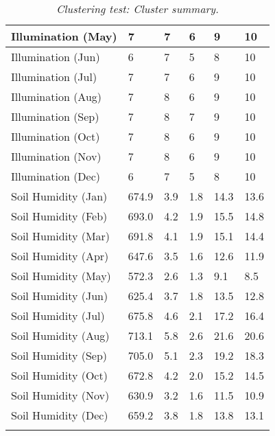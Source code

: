 \begin{longtable}{|p{4cm}|p{2cm}|p{2cm}|p{2cm}|p{2cm}|p{2cm}|}
		\hline
  	    Illumination (May) & 7 & 7 & 6 & 9 & 10 \\
		\hline
		Illumination (Jun) & 6 & 7 & 5 & 8 & 10 \\
		\hline
		Illumination (Jul) & 7 & 7 & 6 & 9 & 10 \\
		\hline
		Illumination (Aug) & 7 & 8 & 6 & 9 & 10 \\
		\hline
		Illumination (Sep) & 7 & 8 & 7 & 9 & 10 \\
		\hline
		Illumination (Oct) & 7 & 8 & 6 & 9 & 10 \\
		\hline
		Illumination (Nov) & 7 & 8 & 6 & 9 & 10 \\
		\hline
		Illumination (Dec) & 6 & 7 & 5 & 8 & 10 \\
		\hline
  	    Soil Humidity (Jan) & 674.9 & 3.9 & 1.8 & 14.3 & 13.6 \\
		\hline
  	    Soil Humidity (Feb) & 693.0 & 4.2 & 1.9 & 15.5 & 14.8 \\
		\hline
  	    Soil Humidity (Mar) & 691.8 & 4.1 & 1.9 & 15.1 & 14.4 \\
		\hline
  	    Soil Humidity (Apr) & 647.6 & 3.5 & 1.6 & 12.6 & 11.9 \\
		\hline
  	    Soil Humidity (May) & 572.3 & 2.6 & 1.3 & 9.1 & 8.5 \\
		\hline
  	    Soil Humidity (Jun) & 625.4 & 3.7 & 1.8 & 13.5 & 12.8 \\
		\hline
  	    Soil Humidity (Jul) & 675.8 & 4.6 & 2.1 & 17.2 & 16.4 \\
		\hline
  	    Soil Humidity (Aug) & 713.1 & 5.8 & 2.6 & 21.6 & 20.6 \\
		\hline
  	    Soil Humidity (Sep) & 705.0 & 5.1 & 2.3 & 19.2 & 18.3 \\
		\hline
  	    Soil Humidity (Oct) & 672.8 & 4.2 & 2.0 & 15.2 & 14.5 \\
		\hline
  	    Soil Humidity (Nov) & 630.9 & 3.2 & 1.6 & 11.5 & 10.9 \\
		\hline
  	    Soil Humidity (Dec) & 659.2 & 3.8 & 1.8 & 13.8 & 13.1\\
		\hline
		\caption{\textit{Clustering test: Cluster summary.}}
	  \label{tab:clustering_test_resulting_clusters}
\end{longtable}